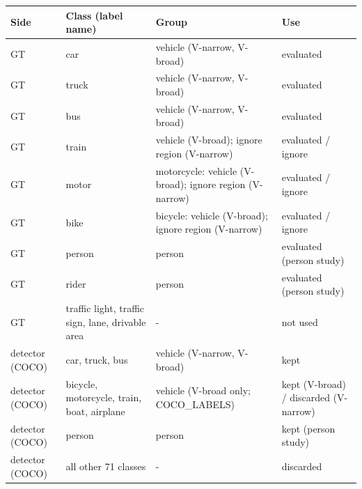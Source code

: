 \begin{tabular}{llll}
\toprule
Side & Class (label name) & Group & Use \\
\midrule
GT & car & vehicle (V-narrow, V-broad) & evaluated \\
GT & truck & vehicle (V-narrow, V-broad) & evaluated \\
GT & bus & vehicle (V-narrow, V-broad) & evaluated \\
GT & train & vehicle (V-broad); ignore region (V-narrow) & evaluated / ignore \\
GT & motor & motorcycle: vehicle (V-broad); ignore region (V-narrow) & evaluated / ignore \\
GT & bike & bicycle: vehicle (V-broad); ignore region (V-narrow) & evaluated / ignore \\
GT & person & person & evaluated (person study) \\
GT & rider & person & evaluated (person study) \\
GT & traffic light, traffic sign, lane, drivable area & - & not used \\
detector (COCO) & car, truck, bus & vehicle (V-narrow, V-broad) & kept \\
detector (COCO) & bicycle, motorcycle, train, boat, airplane & vehicle (V-broad only; COCO\_LABELS) & kept (V-broad) / discarded (V-narrow) \\
detector (COCO) & person & person & kept (person study) \\
detector (COCO) & all other 71 classes & - & discarded \\
\bottomrule
\end{tabular}
